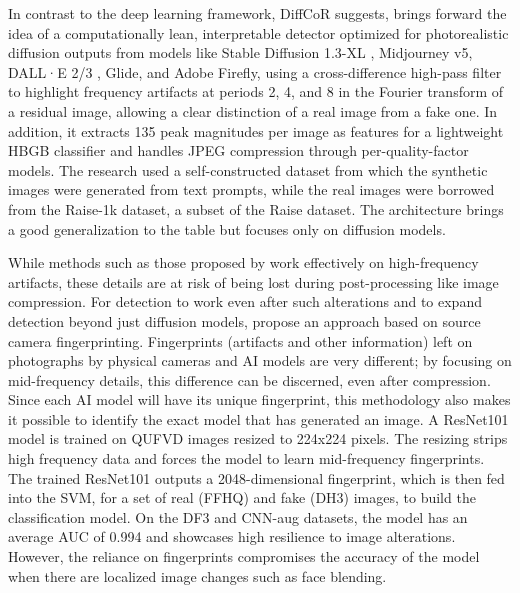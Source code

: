In contrast to the deep learning framework, DiffCoR suggests,
\citet{bammey2024synthbuster} brings forward the idea of a
computationally lean, interpretable detector optimized for
photorealistic diffusion outputs from models like Stable Diffusion
1.3-XL \cite{rombach2022ldm}, Midjourney v5, DALL·E 2/3
\cite{ramesh2022dalle}, Glide, and Adobe Firefly, using a
cross-difference high-pass filter to highlight frequency artifacts at
periods 2, 4, and 8 in the Fourier transform of a residual image,
allowing a clear distinction of a real image from a fake one. In
addition, it extracts 135 peak magnitudes per image as features for a
lightweight HBGB classifier and handles JPEG compression through
per-quality-factor models. The research used a self-constructed
dataset from which the synthetic images were generated from text
prompts, while the real images were borrowed from the Raise-1k
dataset, a subset of the Raise \cite{dang-nguyen2015raise}
dataset. The architecture brings a good generalization to the table
but focuses only on diffusion models.

While methods such as those proposed by \citet{bammey2024synthbuster}
work effectively on high-frequency artifacts, these details are at
risk of being lost during post-processing like image compression. For
detection to work even after such alterations and to expand detection
beyond just diffusion models, \citet{manisha2025camera} propose an
approach based on source camera fingerprinting. Fingerprints
(artifacts and other information) left on photographs by physical
cameras and AI models are very different; by focusing on
mid-frequency details, this difference can be discerned, even after
compression. Since each AI model will have its unique fingerprint,
this methodology also makes it possible to identify the exact model
that has generated an image. A ResNet101 model is trained on QUFVD
images resized to 224x224 pixels. The resizing strips high frequency
data and forces the model to learn mid-frequency fingerprints. The
trained ResNet101 outputs a 2048-dimensional fingerprint, which is
then fed into the SVM, for a set of real (FFHQ) and fake (DH3)
images, to build the classification model. On the DF3 and CNN-aug
datasets, the model has an average AUC of 0.994 and showcases high
resilience to image alterations. However, the reliance on
fingerprints compromises the accuracy of the model when there are
localized image changes such as face blending.

